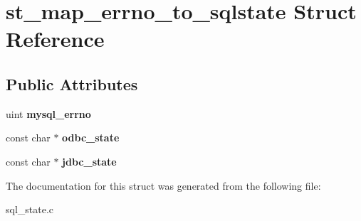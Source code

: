 \hypertarget{structst__map__errno__to__sqlstate}{}\section{st\+\_\+map\+\_\+errno\+\_\+to\+\_\+sqlstate Struct Reference}
\label{structst__map__errno__to__sqlstate}
\subsection*{Public Attributes}
\begin{DoxyCompactItemize}
\item 
\mbox{\label{structst__map__errno__to__sqlstate_a737bcef378f1d6fce2811c622576bc27}} 
uint {\bfseries mysql\+\_\+errno}
\item 
\mbox{\label{structst__map__errno__to__sqlstate_a9deb8654d6a6a75a524b57449db92a48}} 
const char $\ast$ {\bfseries odbc\+\_\+state}
\item 
\mbox{\label{structst__map__errno__to__sqlstate_afe0441d7b1eaafe34be91329e4e0b053}} 
const char $\ast$ {\bfseries jdbc\+\_\+state}
\end{DoxyCompactItemize}


The documentation for this struct was generated from the following file\+:\begin{DoxyCompactItemize}
\item 
sql\+\_\+state.\+c\end{DoxyCompactItemize}
